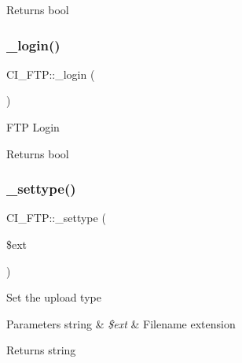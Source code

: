 \begin{DoxyReturn}{Returns}
bool 
\end{DoxyReturn}
\mbox{\label{class_c_i___f_t_p_a37e50e6476719425d21354883f5e0a73}} 
\subsubsection{\texorpdfstring{\+\_\+login()}{\_login()}}
{\footnotesize\ttfamily C\+I\+\_\+\+F\+T\+P\+::\+\_\+login (\begin{DoxyParamCaption}{ }\end{DoxyParamCaption})\hspace{0.3cm}{\ttfamily [protected]}}

F\+TP Login

\begin{DoxyReturn}{Returns}
bool 
\end{DoxyReturn}
\mbox{\label{class_c_i___f_t_p_a114235df43bcf60d12687f09c2bfaaca}} 
\subsubsection{\texorpdfstring{\+\_\+settype()}{\_settype()}}
{\footnotesize\ttfamily C\+I\+\_\+\+F\+T\+P\+::\+\_\+settype (\begin{DoxyParamCaption}\item[{}]{\$ext }\end{DoxyParamCaption})\hspace{0.3cm}{\ttfamily [protected]}}

Set the upload type


\begin{DoxyParams}[1]{Parameters}
string & {\em \$ext} & Filename extension \\
\hline
\end{DoxyParams}
\begin{DoxyReturn}{Returns}
string 
\end{DoxyReturn}
\mbox{\label{class_c_i___f_t_p_add6294004fdafefe45dc1608cc14148e}} 

